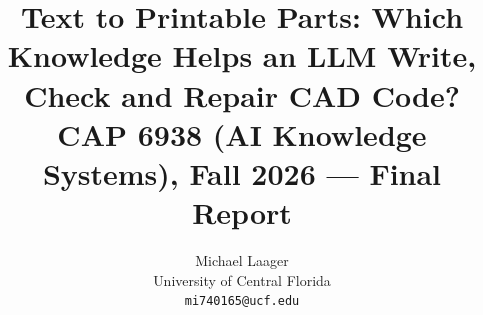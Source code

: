 \documentclass[10pt,twocolumn,letterpaper]{article}
\title{Text to Printable Parts: Which Knowledge Helps an LLM Write, Check and Repair CAD Code?\\
{\large CAP 6938 (AI Knowledge Systems), Fall 2026 --- Final Report}}
\author{Michael Laager\\
University of Central Florida\\
{\tt\small mi740165@ucf.edu}
}
\begin{document}
\maketitle









{
    \small
    \nocite{*} %
    
    
}

\clearpage
\appendix

\end{document}
